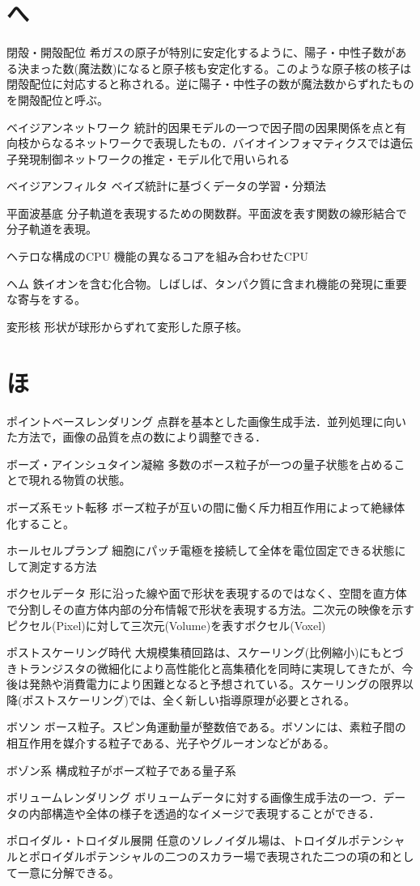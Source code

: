 \begin{用語集}
\section{へ}
\item{閉殻・開殻配位}{}
{希ガスの原子が特別に安定化するように、陽子・中性子数がある決まった数(魔法数)になると原子核も安定化する。このような原子核の核子は閉殻配位に対応すると称される。逆に陽子・中性子の数が魔法数からずれたものを開殻配位と呼ぶ。}
\item{ベイジアンネットワーク}{}
{統計的因果モデルの一つで因子間の因果関係を点と有向枝からなるネットワークで表現したもの．バイオインフォマティクスでは遺伝子発現制御ネットワークの推定・モデル化で用いられる}
\item{ベイジアンフィルタ}{}
{ベイズ統計に基づくデータの学習・分類法}
\item{平面波基底}{}
{分子軌道を表現するための関数群。平面波を表す関数の線形結合で分子軌道を表現。}
\item{ヘテロな構成のCPU}{}
{機能の異なるコアを組み合わせたCPU}
\item{ヘム}{}
{鉄イオンを含む化合物。しばしば、タンパク質に含まれ機能の発現に重要な寄与をする。}
\item{変形核}{}
{形状が球形からずれて変形した原子核。}
\section{ほ}
\item{ポイントベースレンダリング}{}
{点群を基本とした画像生成手法．並列処理に向いた方法で，画像の品質を点の数により調整できる．}
\item{ボーズ・アインシュタイン凝縮}{}
{多数のボース粒子が一つの量子状態を占めることで現れる物質の状態。}
\item{ボーズ系モット転移}{}
{ボーズ粒子が互いの間に働く斥力相互作用によって絶縁体化すること。}
\item{ホールセルプランプ}{}
{細胞にパッチ電極を接続して全体を電位固定できる状態にして測定する方法}
\item{ボクセルデータ}{}
{形に沿った線や面で形状を表現するのではなく、空間を直方体で分割しその直方体内部の分布情報で形状を表現する方法。二次元の映像を示すピクセル(Pixel)に対して三次元(Volume)を表すボクセル(Voxel)}
\item{ポストスケーリング時代}{}
{大規模集積回路は、スケーリング(比例縮小)にもとづきトランジスタの微細化により高性能化と高集積化を同時に実現してきたが、今後は発熱や消費電力により困難となると予想されている。スケーリングの限界以降(ポストスケーリング)では、全く新しい指導原理が必要とされる。}
\item{ボソン}{}
{ボース粒子。スピン角運動量が整数倍である。ボソンには、素粒子間の相互作用を媒介する粒子である、光子やグルーオンなどがある。}
\item{ボゾン系}{}
{構成粒子がボーズ粒子である量子系}
\item{ボリュームレンダリング}{}
{ボリュームデータに対する画像生成手法の一つ．データの内部構造や全体の様子を透過的なイメージで表現することができる．}
\item{ポロイダル・トロイダル展開}{}
{任意のソレノイダル場は、トロイダルポテンシャルとポロイダルポテンシャルの二つのスカラー場で表現された二つの項の和として一意に分解できる。}

\end{用語集}
